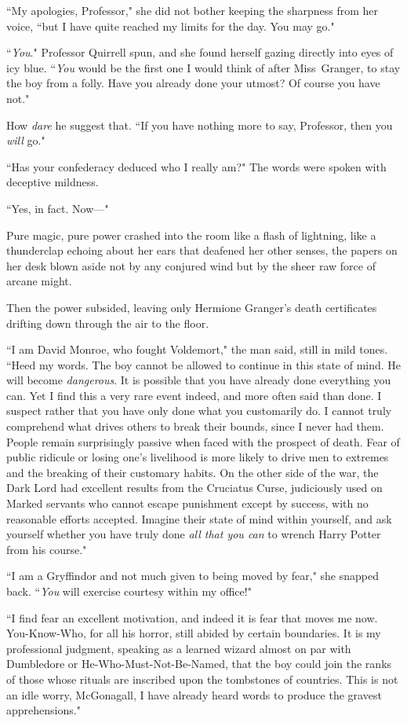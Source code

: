 ``My apologies, Professor," she did not bother keeping the sharpness from her voice, ``but I have quite reached my limits for the day. You may go."

``\emph{You}." Professor Quirrell spun, and she found herself gazing directly into eyes of icy blue. ``\emph{You} would be the first one I would think of after Miss~Granger, to stay the boy from a folly. Have you already done your utmost? Of course you have not."

How \emph{dare} he suggest that. ``If you have nothing more to say, Professor, then you \emph{will} go."

``Has your confederacy deduced who I really am?" The words were spoken with deceptive mildness.

``Yes, in fact. Now—"

Pure magic, pure power crashed into the room like a flash of lightning, like a thunderclap echoing about her ears that deafened her other senses, the papers on her desk blown aside not by any conjured wind but by the sheer raw force of arcane might.

Then the power subsided, leaving only Hermione Granger's death certificates drifting down through the air to the floor.

``I am David Monroe, who fought Voldemort," the man said, still in mild tones. ``Heed my words. The boy cannot be allowed to continue in this state of mind. He will become \emph{dangerous}. It is possible that you have already done everything you can. Yet I find this a very rare event indeed, and more often said than done. I suspect rather that you have only done what you customarily do. I cannot truly comprehend what drives others to break their bounds, since I never had them. People remain surprisingly passive when faced with the prospect of death. Fear of public ridicule or losing one's livelihood is more likely to drive men to extremes and the breaking of their customary habits. On the other side of the war, the Dark Lord had excellent results from the Cruciatus Curse, judiciously used on Marked servants who cannot escape punishment except by success, with no reasonable efforts accepted. Imagine their state of mind within yourself, and ask yourself whether you have truly done \emph{all that you can} to wrench Harry Potter from his course."

``I am a Gryffindor and not much given to being moved by fear," she snapped back. ``\emph{You} will exercise courtesy within my office!"

``I find fear an excellent motivation, and indeed it is fear that moves me now. You-Know-Who, for all his horror, still abided by certain boundaries. It is my professional judgment, speaking as a learned wizard almost on par with Dumbledore or He-Who-Must-Not-Be-Named, that the boy could join the ranks of those whose rituals are inscribed upon the tombstones of countries. This is not an idle worry, McGonagall, I have already heard words to produce the gravest apprehensions."


